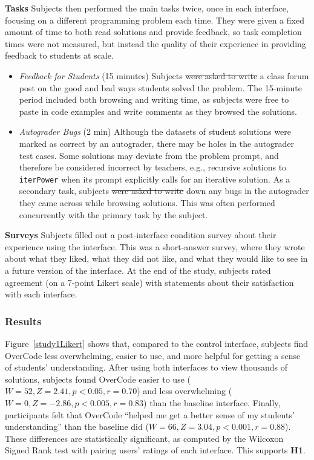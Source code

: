 \documentclass[12pt,twoside]{mitthesis}
\newcommand \codevar[1]{\texttt{#1}}
\providecommand{\DIFaddtex}[1]{{\protect\color{blue}\uwave{#1}}} %
\providecommand{\DIFdeltex}[1]{{\protect\color{red}\sout{#1}}}                      %
\providecommand{\DIFaddbegin}{} %
\providecommand{\DIFaddend}{} %
\providecommand{\DIFdelbegin}{} %
\providecommand{\DIFdelend}{} %
\providecommand{\DIFadd}[1]{\texorpdfstring{\DIFaddtex{#1}}{#1}} %
\providecommand{\DIFdel}[1]{\texorpdfstring{\DIFdeltex{#1}}{}} %
\begin{document}
{\bf Tasks} Subjects then performed the main tasks twice, once in each interface, focusing on a different programming problem each time. They were given a fixed amount of time to both read solutions and provide feedback, so task completion times were not measured, but instead the quality of their experience in providing feedback to students at scale.

 \begin{itemize} 
\item {\it Feedback for Students} (15 minutes) Subjects \DIFdelbegin \DIFdel{were asked to write }\DIFdelend \DIFaddbegin \DIFadd{wrote }\DIFaddend a class forum post on the good and bad ways students solved the problem. The 15-minute period included both browsing and writing time, as subjects were free to paste in code examples and write comments as they browsed the solutions.

\item {\it Autograder Bugs} (2 min) Although the datasets of student solutions were marked as correct by an autograder, there may be holes in the autograder test cases. Some solutions may deviate from the problem prompt, and therefore be considered incorrect by teachers, e.g., recursive solutions to \codevar{iterPower} when its prompt explicitly calls for an iterative solution. As a secondary task, subjects \DIFdelbegin \DIFdel{were asked to write }\DIFdelend \DIFaddbegin \DIFadd{wrote }\DIFaddend down any bugs in the autograder they came across while browsing solutions. This was often performed concurrently with the primary task by the subject.
 \end{itemize} 
{\bf Surveys} Subjects filled out a post-interface condition survey about their experience using the interface. This was a short-answer survey, where they wrote about what they liked, what they did not like, and what they would like to see in a future version of the interface. At the end of the study, subjects rated agreement (on a 7-point Likert scale) with statements about their satisfaction with each interface.

\subsubsection{Results}
Figure~\ref{study1Likert} shows that, compared to the control interface, subjects find OverCode less overwhelming, easier to use, and more helpful for getting a sense of students' understanding. After using both interfaces to view thousands of solutions, subjects found OverCode easier to use ($W=52, Z=2.41, p<0.05, r=0.70$) and less overwhelming ($W=0, Z=-2.86, p<0.005, r=0.83$) than the baseline interface. Finally, participants felt that OverCode ``helped me get a better sense of my students' understanding'' than the baseline did ($W=66, Z=3.04, p<0.001, r=0.88$). These differences are statistically significant, as computed by the Wilcoxon Signed Rank test with pairing users' ratings of each interface. This supports \textbf{H1}\DIFaddbegin \DIFadd{, the hypothesis on interface satisfaction}\DIFaddend .
\end{document}
